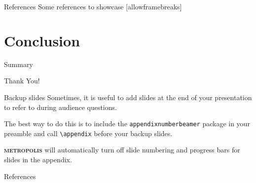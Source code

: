 \documentclass[12pt]{beamer}
\newcommand{\themename}{\textbf{\textsc{metropolis}}\xspace}
\begin{document}
\begin{frame}{References}
  Some references to showcase [allowframebreaks] \cite{knuth92,ConcreteMath,Simpson,Er01,greenwade93}
\end{frame}

\section{Conclusion}

\begin{frame}{Summary}


\end{frame}

\begin{frame}[standout]
  Thank You!
\end{frame}

\appendix

\begin{frame}[fragile]{Backup slides}
  Sometimes, it is useful to add slides at the end of your presentation to
  refer to during audience questions.

  The best way to do this is to include the \verb|appendixnumberbeamer|
  package in your preamble and call \verb|\appendix| before your backup slides.

  \themename will automatically turn off slide numbering and progress bars for
  slides in the appendix.
\end{frame}

\begin{frame}[allowframebreaks]{References}

  
  

\end{frame}
\end{document}
